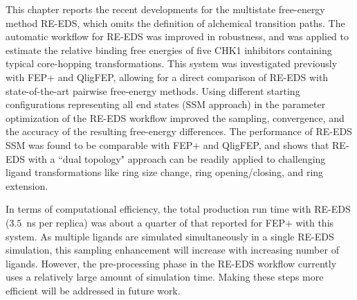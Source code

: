 This chapter reports the recent developments for the multistate free-energy method RE-EDS, which omits the definition of alchemical transition paths. The automatic workflow for RE-EDS was improved in robustness, and was applied to estimate the relative binding free energies of five CHK1 inhibitors containing typical core-hopping transformations. This system was investigated previously with FEP+ and QligFEP, allowing for a direct comparison of RE-EDS with state-of-the-art pairwise free-energy methods.
Using different starting configurations representing all end states (SSM approach) in the parameter optimization of the RE-EDS workflow improved the sampling, convergence, and the accuracy of the resulting free-energy differences. The performance of RE-EDS SSM was found to be comparable with FEP+ and QligFEP, and shows that RE-EDS with a ``dual topology" approach can be readily applied to challenging ligand transformations like ring size change, ring opening/closing, and ring extension.

In terms of computational efficiency, the total production run time with RE-EDS ($3.5$~ns per replica) was about a quarter of that reported for FEP+ with this system. As multiple ligands are simulated simultaneously in a single RE-EDS simulation, this sampling enhancement will increase with increasing number of ligands. 
However, the pre-processing phase in the RE-EDS workflow currently uses a relatively large amount of simulation time. Making these steps more efficient will be addressed in future work.
